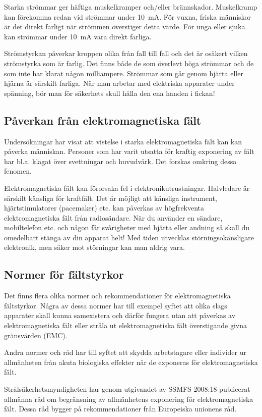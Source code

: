 Starka strömmar ger häftiga muskelkramper och/eller brännskador. Muskelkramp
kan förekomma redan vid strömmar under 10~mA. För vuxna, friska människor är
det direkt farligt när strömmen överstiger detta värde. För unga eller sjuka
kan strömmar under 10~mA vara direkt farliga.

Strömstyrkan påverkar kroppen olika från fall till fall och det är osäkert
vilken strömstyrka som är farlig. Det finns både de som överlevt höga strömmar
och de som inte har klarat någon milliampere. Strömmar som går genom hjärta
eller hjärna är särskilt farliga. När man arbetar med elektriska apparater
under spänning, bör man för säkerhets skull hålla den ena handen i fickan!

\subsection{Påverkan från elektromagnetiska fält}

Undersökningar har visat att vistelse i starka elektromagnetiska fält
kan kan påverka människan. Personer som har varit utsatta för kraftig
exponering av fält har bl.a. klagat över svettningar och
huvudvärk. Det forskas omkring dessa fenomen.

Elektromagnetiska fält kan förorsaka fel i
elektronikutrustningar. Halvledare är särskilt känsliga för
kraftfält. Det är möjligt att känsliga instrument, hjärtstimulatorer
(pacemaker) etc. kan påverkas av högfrekventa elektromagnetiska
fält från radiosändare. När du använder en sändare, mobiltelefon etc.
och någon får svårigheter med hjärta eller andning så skall du
omedelbart stänga av din apparat helt! Med tiden utvecklas
störningsokänsligare elektronik, men säker mot störningar kan man
aldrig vara.

\subsection{Normer för fältstyrkor}

Det finns flera olika normer och rekommendationer för elektromagnetiska
fältstyrkor. Några av dessa normer har till exempel syftet att olika slags
apparater skall kunna samexistera och därför fungera utan att påverkas av
elektromagnetiska fält eller stråla ut elektromagnetiska fält överstigande
givna gränsvärden (EMC).

Andra normer och råd har till syftet att skydda arbetstagare eller individer
ur allmänheten från akuta biologiska effekter när de exponeras för
elektromagnetiska fält.

Strålsäkerhetsmyndigheten har genom utgivandet av SSMFS 2008:18 publicerat
allmänna råd om begränsning av allmänhetens exponering för elektromagnetiska
fält. Dessa råd bygger på rekommendationer från Europeiska unionens råd. 
